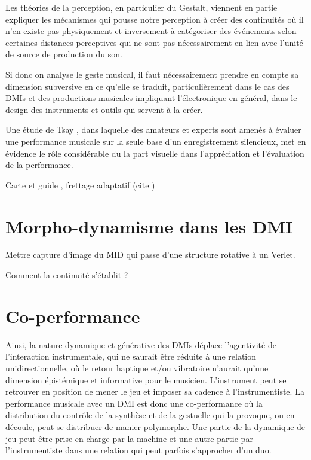 Les théories de la perception, en particulier du Gestalt, viennent en partie expliquer les mécanismes qui pousse notre perception à créer des continuités où il n'en existe pas physiquement et inversement à catégoriser des événements selon certaines distances perceptives qui ne sont pas nécessairement en lien avec l'unité de source de production du son.

Si donc on analyse le geste musical, il faut nécessairement prendre en compte sa dimension subversive en ce qu'elle se traduit, particulièrement dans le cas des DMIs et des productions musicales impliquant l'électronique en général, dans le design des instruments et outils qui servent à la créer.

\cite{bin_show_2018}

Une étude de Tsay \cite{tsay_sight_2013}, dans laquelle des amateurs et experts sont amenés à évaluer une performance musicale sur la seule base d'un enregistrement silencieux, met en évidence le rôle considérable du la part visuelle dans l'appréciation et l'évaluation de la performance.


Carte et guide , frettage adaptatif (cite \cite{goudard_playing_2014})

\section{Morpho-dynamisme dans les DMI}

Mettre capture d'image du MID qui passe d'une structure rotative à un Verlet.

Comment la continuité s'établit ?



\section{Co-performance}
Ainsi, la nature dynamique et générative des DMIs déplace l'agentivité de l'interaction instrumentale, qui ne saurait être réduite à une relation unidirectionnelle, où le retour haptique et/ou vibratoire n'aurait qu'une dimension épistémique et informative pour le musicien.
L'instrument peut se retrouver en position de mener le jeu et imposer sa cadence à l'instrumentiste. La performance musicale avec un DMI est donc une co-performance où la distribution du contrôle de la synthèse et de la gestuelle qui la provoque, ou en découle, peut se distribuer de manier polymorphe. Une partie de la dynamique de jeu peut être prise en charge par la machine et une autre partie par l'instrumentiste dans une relation qui peut parfois s'approcher d'un duo.

